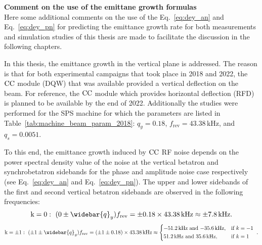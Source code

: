 \textbf{Comment on the use of the emittane growth formulas}\\
Here some additional comments on the use of the Eq.~\eqref{eq:dey_an} and Eq.~\eqref{eq:dey_pn} for predicting the emittance growth rate for both measurements and simulation studies of this thesis are made to facilitate the discussion in the following chapters.

In this thesis, the emittance growth in the vertical plane is addressed. The reason is that for both experimental campaigns that took place in 2018 and 2022, the ${\mathrm{CC}}$ module (DQW) that was available provided a vertical deflection on the beam. For reference, the ${\mathrm{CC}}$ module which provides horizontal deflection (RFD) is planned to be available by the end of 2022. Additionally the studies were performed for the SPS machine for which the parameters are listed in Table~\ref{tab:machine_beam_param_2018}: $q_y=0.18$, $f_\mathrm{rev}=43.38$\,kHz, and $q_s=0.0051$. 

To this end, the emittance growth induced by ${\mathrm{CC}}$ RF noise depends on the power spectral density value of the noise at the vertical betatron and synchrobetatron sidebands for the phase and amplitude noise case respectively (see Eq.~\eqref{eq:dey_an} and Eq.~\eqref{eq:dey_pn}). The upper and lower sidebands of the first and second vertical betatron sidebands are observed in the following frequencies:
\begin{equation}\label{eq:betatron_sideband_1}
    \mathrm{k=0}: \ (0 \pm \widebar{q}_y) f_\mathrm{rev} = \pm 0.18 \times 43.38\mathrm{\,kHz} \approx \pm 7.8\mathrm{\,kHz}.
\end{equation}
\begin{equation}\label{eq:betatron_sideband_2}
    \mathrm{k= \pm 1}: \ (\pm 1 \pm \widebar{q}_y) f_\mathrm{rev} = (\pm 1 \pm 0.18) \times 43.38\mathrm{\,kHz} \approx \begin{dcases*} 
        \text{$-$51.2\,kHz and $-$35.6\,kHz,} & if  $k=-1$ \\ 
        \text{51.2\,kHz and 35.6\,kHz,} & if  $k=1$  
        \end{dcases*} .
\end{equation}

